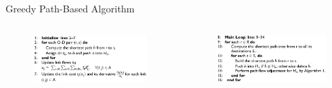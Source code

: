 \documentclass{beamer}
\begin{document}
\begin{frame}{Greedy Path-Based Algorithm}
\begin{columns}
    \begin{column}{0.33\textwidth}
    \begin{figure}
    \includegraphics[width=\textwidth]{./alg21.jpg}
    \end{figure}
    \end{column}

    \begin{column}{0.33\textwidth}
    \begin{figure}
    \includegraphics[width=\textwidth]{./alg22.jpg}
    \end{figure}
    \end{column}


\end{columns}
\end{frame}
\end{document}
